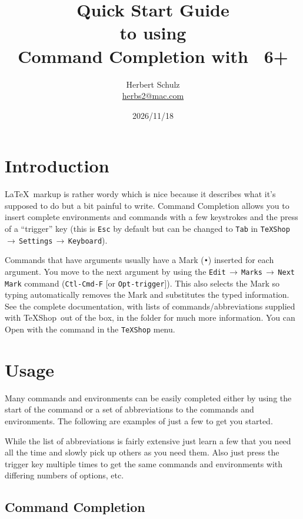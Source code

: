 \documentclass[11pt]{article}
\title{Quick Start Guide\\ to using\\ Command Completion with \TS\ 6+}
\author{Herbert Schulz\\\small\href{mailto:herbs2@mac.com}{herbs2@mac.com}}
\date{2026/11/18}
\newcommand{\mnu}[1]{\texttt{#1}}
\newcommand{\cmd}[1]{\texttt{#1}}
\newcommand{\To}{\,\(\to\)\,}
\newcommand{\TS}{\textsf{\TeX Shop}}
\begin{document}
\maketitle
\thispagestyle{empty}

\section*{Introduction}

\LaTeX\ markup is rather wordy which is nice because it describes what it's supposed to do but a bit painful to write. Command Completion allows you to insert complete environments and commands with a few keystrokes and the press of a ``trigger'' key (this is \cmd{Esc} by default but can be changed to \cmd{Tab} in \mnu{TeXShop}\To\mnu{Settings}\To\mnu{Keyboard}).

Commands that have arguments usually have a Mark (\texttt{•}) inserted for each argument. You move to the next argument by using the \mnu{Edit}\To\mnu{Marks}\To\mnu{Next Mark} command (\cmd{Ctl-Cmd-F} [or \cmd{Opt-trigger}]). This also selects the Mark so typing automatically removes the Mark and substitutes the typed information. See the complete documentation, with lists of commands/abbreviations supplied with \TS\ out of the box, in the  folder for much more information. You can Open  with the command in the \mnu{TeXShop} menu.

\section*{Usage}

Many commands and environments can be easily completed either by using the start of the command or a set of abbreviations to the commands and environments. The following are examples of just a few to get you started.

While the list of abbreviations is fairly extensive just learn a few that you need all the time and slowly pick up others as you need them. Also just press the trigger key multiple times to get the same commands and environments with differing numbers of options, etc.

\subsection*{Command Completion}
\end{document}
